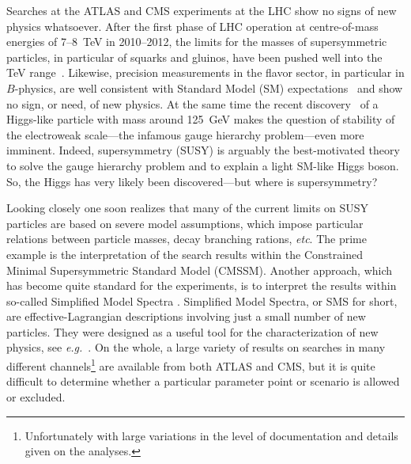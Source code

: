 \documentclass[12pt]{article}
\def\eg{{\it e.g.}}
\begin{document}
Searches at the ATLAS and CMS experiments at the LHC show no signs of new physics whatsoever. 
After the first phase of LHC operation at centre-of-mass energies of 7--8~TeV in 2010--2012, 
the limits for the masses of supersymmetric particles, in particular of  squarks and gluinos, 
have been pushed well into the TeV range~\cite{atlas:susy:twiki,cms:susy:twiki}. 
Likewise, precision measurements in the flavor sector, in particular in $B$-physics, 
are well consistent with Standard Model (SM) expectations~\cite{Amhis:2012bh,lhcb:2012ct} 
and show no sign, or need, of new physics. 
At the same time the recent discovery~\cite{atlas:2012gk,cms:2012gu} of a Higgs-like particle 
with mass around 125~GeV makes the question of stability of the electroweak scale---the 
infamous gauge hierarchy problem---even  more imminent. 
Indeed, supersymmetry (SUSY) is arguably the best-motivated theory to solve the gauge 
hierarchy problem and to explain a light SM-like Higgs boson. 
So, the Higgs has very likely been discovered---but where is supersymmetry? 

Looking closely \cite{Sekmen:2011cz,Arbey:2011un,Papucci:2011wy,CahillRowley:2012kx,Dreiner:2012gx,Mahbubani:2012qq} 
one soon realizes that many of the current limits on SUSY particles are based 
on severe model assumptions, which impose particular relations between particle masses, decay 
branching rations, {\it etc}. The prime example is the interpretation of the search results within the 
Constrained Minimal Supersymmetric Standard Model (CMSSM). Another approach, which   
has become quite standard for the experiments, is to interpret the results 
within so-called Simplified Model Spectra \cite{Okawa:2011xg,cms:2013wc}.  
Simplified Model Spectra, or SMS for short, are effective-Lagrangian descriptions involving %
just a small number of new particles. They were designed as a useful tool for the characterization 
of new physics, see \eg\ \cite{Alwall:2008ag,Alves:2011wf}. 
On the whole, a large variety of results on searches in many different channels\footnote{Unfortunately with large variations in the level of documentation and details given on the analyses.} are available from both ATLAS and CMS, but it is quite difficult to determine whether a particular parameter point or scenario is allowed or excluded. 
\end{document}
